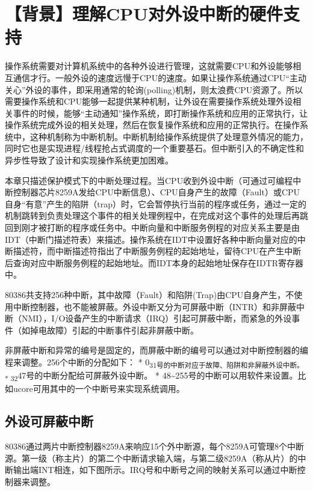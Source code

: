 \section{【背景】理解CPU对外设中断的硬件支持}\label{ux80ccux666fux7406ux89e3cpuux5bf9ux5916ux8bbeux4e2dux65adux7684ux786cux4ef6ux652fux6301}

操作系统需要对计算机系统中的各种外设进行管理，这就需要CPU和外设能够相互通信才行。一般外设的速度远慢于CPU的速度。如果让操作系统通过CPU``主动关心''外设的事件，即采用通常的轮询(polling)机制，则太浪费CPU资源了。所以需要操作系统和CPU能够一起提供某种机制，让外设在需要操作系统处理外设相关事件的时候，能够``主动通知''操作系统，即打断操作系统和应用的正常执行，让操作系统完成外设的相关处理，然后在恢复操作系统和应用的正常执行。在操作系统中，这种机制称为中断机制。中断机制给操作系统提供了处理意外情况的能力，同时它也是实现进程/线程抢占式调度的一个重要基石。但中断引入的不确定性和异步性导致了设计和实现操作系统更加困难。

本章只描述保护模式下的中断处理过程。当CPU收到外设中断（可通过可编程中断控制器芯片8259A发给CPU中断信息）、CPU自身产生的故障（Fault）或CPU自身``有意''产生的陷阱（trap）时，它会暂停执行当前的程序或任务，通过一定的机制跳转到负责处理这个事件的相关处理例程中，在完成对这个事件的处理后再跳回到刚才被打断的程序或任务中。中断向量和中断服务例程的对应关系主要是由IDT（中断门描述符表）来描述。操作系统在IDT中设置好各种中断向量对应的中断描述符，而中断描述符指出了中断服务例程的起始地址，留待CPU在产生中断后查询对应中断服务例程的起始地址。而IDT本身的起始地址保存在IDTR寄存器中。

80386共支持256种中断，其中故障（Fault）和陷阱(Trap)由CPU自身产生，不使用中断控制器，也不能被屏蔽。外设中断又分为可屏蔽中断（INTR）和非屏蔽中断（NMI），I/O设备产生的中断请求（IRQ）引起可屏蔽中断，而紧急的外设事件（如掉电故障）引起的中断事件引起非屏蔽中断。

非屏蔽中断和异常的编号是固定的，而屏蔽中断的编号可以通过对中断控制器的编程来调整。256个中断的分配如下：
* 0\textsubscript{31号的中断对应于故障、陷阱和非屏蔽外设中断。 *
32}47号的中断分配给可屏蔽外设中断。 *
48\textasciitilde{}255号的中断可以用软件来设置。比如ucore可用其中的一个中断号来实现系统调用。

\subsection{外设可屏蔽中断}\label{ux5916ux8bbeux53efux5c4fux853dux4e2dux65ad}

80386通过两片中断控制器8259A来响应15个外中断源，每个8259A可管理8个中断源。第一级（称主片）的第二个中断请求输入端，与第二级8259A（称从片）的中断输出端INT相连，如下图所示。IRQ号和中断号之间的映射关系可以通过中断控制器来调整。

